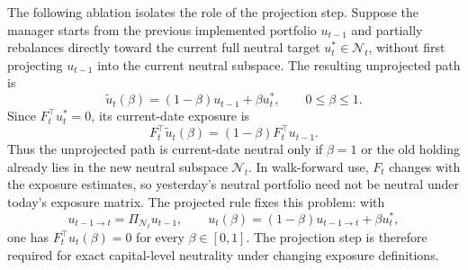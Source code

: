 \documentclass[11pt]{article}
\newcommand{\N}{\mathcal{N}}
\begin{document}
The following ablation isolates the role of the projection step.  Suppose the manager starts from the previous implemented portfolio $u_{t-1}$ and partially rebalances directly toward the current full neutral target $u_t^*\in\N_t$, without first projecting $u_{t-1}$ into the current neutral subspace.  The resulting unprojected path is
\begin{equation}
    \widetilde u_t(\beta)=(1-\beta)u_{t-1}+\beta u_t^*,\qquad 0\leq \beta\leq 1.
\end{equation}
Since $F_t^\top u_t^*=0$, its current-date exposure is
\begin{equation}
    F_t^\top \widetilde u_t(\beta)=(1-\beta)F_t^\top u_{t-1}.
\end{equation}
Thus the unprojected path is current-date neutral only if $\beta=1$ or the old holding already lies in the new neutral subspace $\N_t$.  In walk-forward use, $F_t$ changes with the exposure estimates, so yesterday's neutral portfolio need not be neutral under today's exposure matrix.  The projected rule fixes this problem: with
\begin{equation}
    u_{t-1\to t}=\Pi_{\N_t}u_{t-1},\qquad
    u_t(\beta)=(1-\beta)u_{t-1\to t}+\beta u_t^*,
\end{equation}
one has $F_t^\top u_t(\beta)=0$ for every $\beta\in[0,1]$.  The projection step is therefore required for exact capital-level neutrality under changing exposure definitions.
\end{document}
